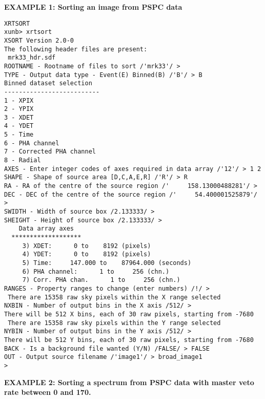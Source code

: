 {\bf EXAMPLE 1: Sorting an image from PSPC data}

\begin{verbatim}
XRTSORT
xunb> xrtsort
XSORT Version 2.0-0
The following header files are present:
 mrk33_hdr.sdf
ROOTNAME - Rootname of files to sort /'mrk33'/ > 
TYPE - Output data type - Event(E) Binned(B) /'B'/ > B
Binned dataset selection
--------------------------
1 - XPIX
2 - YPIX
3 - XDET
4 - YDET
5 - Time
6 - PHA channel
7 - Corrected PHA channel
8 - Radial
AXES - Enter integer codes of axes required in data array /'12'/ > 1 2
SHAPE - Shape of source area [D,C,A,E,R] /'R'/ > R
RA - RA of the centre of the source region /'     158.13000488281'/ > 
DEC - DEC of the centre of the source region /'     54.400001525879'/ > 
SWIDTH - Width of source box /2.133333/ > 
SHEIGHT - Height of source box /2.133333/ > 
    Data array axes
  *******************
     3) XDET:      0 to    8192 (pixels)
     4) YDET:      0 to    8192 (pixels)
     5) Time:     147.000 to    87964.000 (seconds)
     6) PHA channel:      1 to     256 (chn.)
     7) Corr. PHA chan.      1 to     256 (chn.)
RANGES - Property ranges to change (enter numbers) /!/ > 
 There are 15358 raw sky pixels within the X range selected
NXBIN - Number of output bins in the X axis /512/ > 
There will be 512 X bins, each of 30 raw pixels, starting from -7680
 There are 15358 raw sky pixels within the Y range selected
NYBIN - Number of output bins in the Y axis /512/ > 
There will be 512 Y bins, each of 30 raw pixels, starting from -7680
BACK - Is a background file wanted (Y/N) /FALSE/ > FALSE
OUT - Output source filename /'image1'/ > broad_image1
> 
\end{verbatim}

\newpage
{\bf EXAMPLE 2: Sorting a spectrum from PSPC data with master veto rate
between 0 and 170.}

